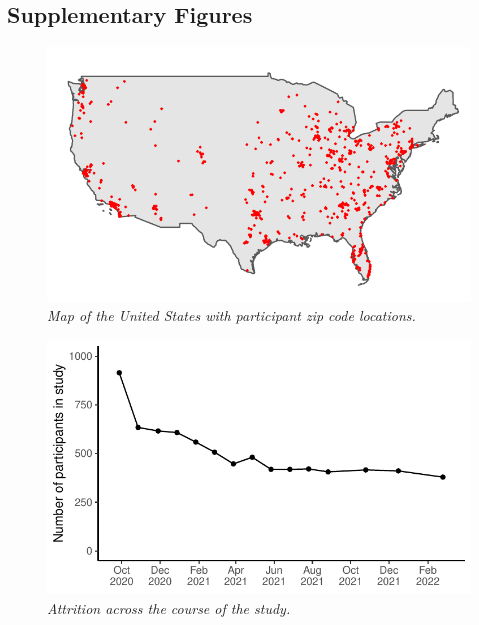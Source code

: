 \documentclass[
  english,
  man,floatsintext]{apa6}
\begin{document}
\newpage

\hypertarget{supplementary-figures}{%
\subsection{Supplementary Figures}\label{supplementary-figures}}



\begin{figure}
\centering
\includegraphics{manuscript_files/figure-latex/plotUSMap-1.pdf}
\caption{\label{fig:plotUSMap}\emph{Map of the United States with participant zip code locations.}}
\end{figure}

\newpage



\begin{figure}
\centering
\includegraphics{manuscript_files/figure-latex/plotAttrition-1.pdf}
\caption{\label{fig:plotAttrition}\emph{Attrition across the course of the study.}}
\end{figure}
\end{document}
